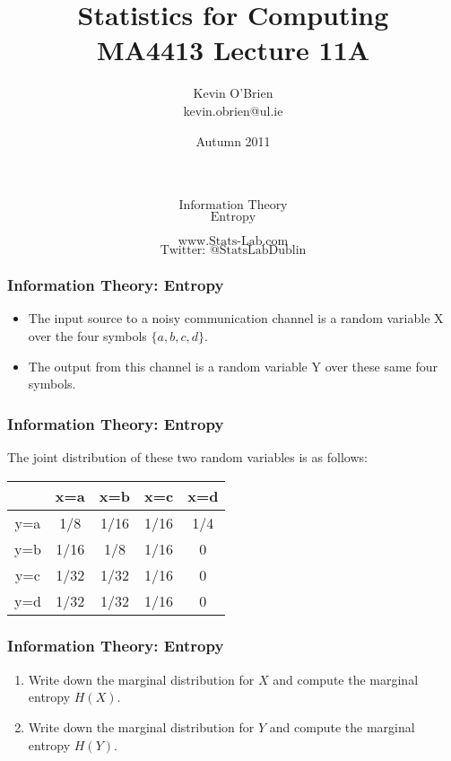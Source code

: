 ﻿\documentclass[a4]{beamer}
\title[MA4413]{Statistics for Computing \\ {\normalsize MA4413 Lecture 11A}}
\author[Kevin O'Brien]{Kevin O'Brien \\ {\scriptsize kevin.obrien@ul.ie}}
\date{Autumn 2011}
\institute[Maths \& Stats]{Dept. of Mathematics \& Statistics, \\ University \textit{of} Limerick}
\begin{document}
\begin{frame}
\Huge
\[\mbox{Information Theory}\]
\[\mbox{Entropy}\]

\Large
\[\mbox{www.Stats-Lab.com}\]
\[\mbox{Twitter: @StatsLabDublin}\]
\end{frame}
\begin{frame}
\frametitle{Information Theory: Entropy}
\Large
\begin{itemize}
\item The input source to a noisy communication channel is a random variable X over the
four symbols $\{a, b, c, d\}$. \item  The output from this channel is a random variable Y over these same
four symbols.
\end{itemize}

\end{frame}
\begin{frame}
\frametitle{Information Theory: Entropy}
\Large
The joint distribution of these two random variables is as follows:\\ \bigskip
\begin{center}
\begin{tabular}{|c||c|c|c|c|}
\hline
&x=a& x=b & x=c & x=d \\ \hline \hline
y=a &1/8 &1/16 &1/16 &1/4 \\ \hline
y=b &1/16 & 1/8& 1/16& 0 \\ \hline
y=c & 1/32&1/32 & 1/16 & 0\\ \hline
y=d & 1/32& 1/32& 1/16 & 0\\ \hline 
\end{tabular}
\end{center}
\end{frame}
\begin{frame}
\frametitle{Information Theory: Entropy}
\Large
\begin{enumerate}
\item Write down the marginal distribution for $X$ and compute the marginal entropy $H(X)$.
\item Write down the marginal distribution for $Y$ and compute the marginal entropy $H(Y )$.
\end{enumerate}
\end{frame}
\end{document}

